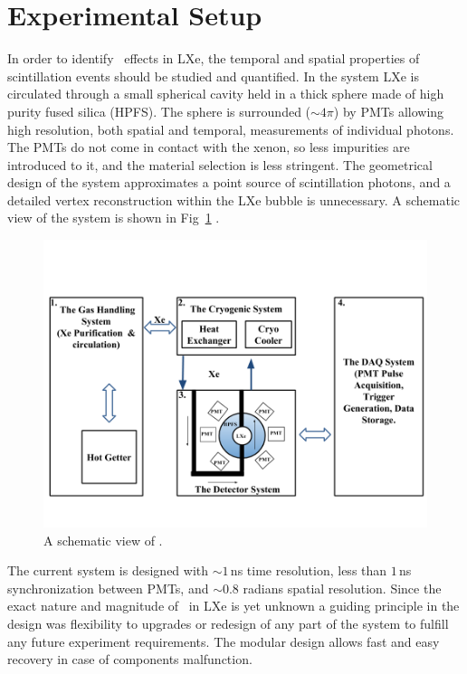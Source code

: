 \section{Experimental Setup}


In order to identify \superradiance\ effects in LXe, the temporal and spatial properties of scintillation events should be studied and quantified. In the \direxeno system LXe is circulated through a small spherical cavity held in a thick sphere made of high purity fused silica (HPFS). The sphere is surrounded ($\sim4\pi$) by PMTs allowing high resolution, both spatial and temporal, measurements of individual photons. The PMTs do not come in contact with the xenon, so less impurities are introduced to it, and the material selection is less stringent. The geometrical design of the system approximates a point  source of scintillation photons, and a detailed vertex reconstruction within the LXe bubble is unnecessary. A schematic view of the system is shown in Fig~\ref{fig:detSch} . 

\begin{figure}[h]
\centerline{\includegraphics[width=0.8\linewidth]{DetSch.png}}
\caption{A schematic view of \direxeno.}
\label{fig:detSch}
\end{figure}


The current system is designed with $\sim1$\,ns time resolution, less than $1$\,ns synchronization between PMTs, and $\sim0.8$ radians spatial resolution. Since the exact nature and magnitude of \superradiance\ in LXe is yet unknown a guiding principle in the design was flexibility to upgrades or redesign of any part of the system to fulfill any future experiment requirements. The modular design allows fast and easy recovery in case of components malfunction.

